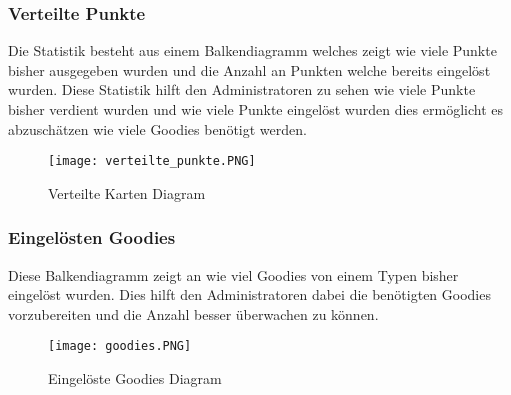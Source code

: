 \subsubsection{Verteilte Punkte}
Die Statistik besteht aus einem Balkendiagramm welches zeigt wie viele Punkte bisher ausgegeben wurden und die Anzahl an Punkten welche bereits eingelöst wurden. 
Diese Statistik hilft den Administratoren zu sehen wie viele Punkte bisher verdient wurden und wie viele Punkte eingelöst wurden dies ermöglicht es abzuschätzen wie viele Goodies benötigt werden. 	
\begin{figure}[H]
	\centering
	\texttt{[image: verteilte\_punkte.PNG]}
	\caption{Verteilte Karten Diagram}
\end{figure}
\subsubsection{Eingelösten Goodies}
Diese Balkendiagramm zeigt an wie viel Goodies von einem Typen bisher eingelöst wurden. Dies hilft den Administratoren dabei die benötigten Goodies vorzubereiten und die Anzahl besser überwachen zu können. 
\begin{figure}[H]
	\centering
	\texttt{[image: goodies.PNG]}
	\caption{Eingelöste Goodies Diagram}
\end{figure}